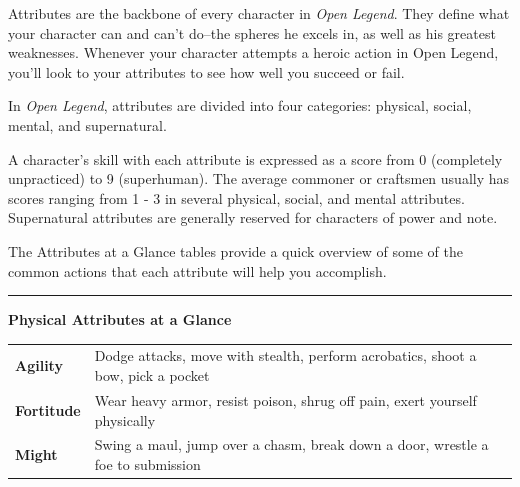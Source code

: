 \documentclass[12pt]{report}
\begin{document}
Attributes are the backbone of every character in \emph{Open Legend}.
They define what your character can and can't do--the spheres he excels
in, as well as his greatest weaknesses. Whenever your character attempts
a heroic action in Open Legend, you'll look to your attributes to see
how well you succeed or fail.

In \emph{Open Legend}, attributes are divided into four categories:
physical, social, mental, and supernatural.

A character's skill with each attribute is expressed as a score from 0
(completely unpracticed) to 9 (superhuman). The average commoner or
craftsmen usually has scores ranging from 1 - 3 in several physical,
social, and mental attributes. Supernatural attributes are generally
reserved for characters of power and note.

The Attributes at a Glance tables provide a quick overview of some of
the common actions that each attribute will help you accomplish.

\begin{center}\rule{0.5\linewidth}{\linethickness}\end{center}

\textbf{Physical Attributes at a Glance}

\begin{longtable}[c]{@{}ll@{}}
\toprule
\begin{minipage}[t]{0.03\columnwidth}\raggedright\strut
\textbf{Agility}
\strut\end{minipage} &
\begin{minipage}[t]{0.07\columnwidth}\raggedright\strut
Dodge attacks, move with stealth, perform acrobatics, shoot a bow, pick
a pocket
\strut\end{minipage}\tabularnewline
\begin{minipage}[t]{0.03\columnwidth}\raggedright\strut
\textbf{Fortitude}
\strut\end{minipage} &
\begin{minipage}[t]{0.07\columnwidth}\raggedright\strut
Wear heavy armor, resist poison, shrug off pain, exert yourself
physically
\strut\end{minipage}\tabularnewline
\begin{minipage}[t]{0.03\columnwidth}\raggedright\strut
\textbf{Might}
\strut\end{minipage} &
\begin{minipage}[t]{0.07\columnwidth}\raggedright\strut
Swing a maul, jump over a chasm, break down a door, wrestle a foe to
submission
\strut\end{minipage}\tabularnewline
\bottomrule
\end{longtable}
\end{document}
